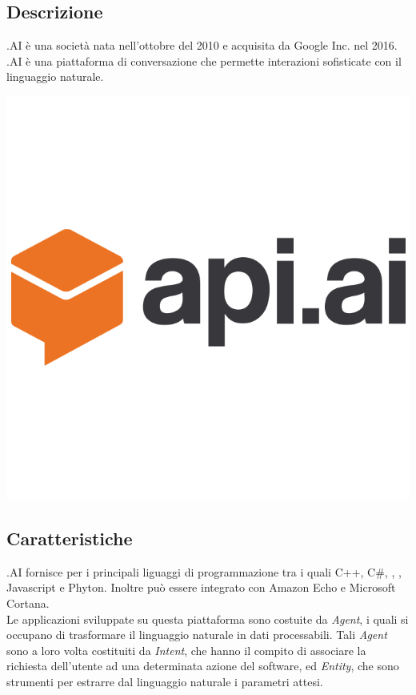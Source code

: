 \documentclass[a4paper,titlepage]{article}
\begin{document}
	\subsection{Descrizione}
	\begin{minipage}{0.7\textwidth}\raggedright
		.AI è una società nata nell'ottobre del 2010 e acquisita da Google Inc. nel 2016.
		.AI è una piattaforma di conversazione che permette interazioni sofisticate con il linguaggio naturale.
	\end{minipage}
	\hfill
	\noindent\begin{minipage}{0.1\textwidth}
		\includegraphics[scale=0.15]{images/apiai.png}
	\end{minipage}
	\subsection{Caratteristiche}
	.AI fornisce  per i principali liguaggi di programmazione tra i quali C++, C\#, , , Javascript e Phyton. Inoltre può essere integrato con Amazon Echo e Microsoft Cortana.\\
	Le applicazioni sviluppate su questa piattaforma sono costuite da \textit{Agent}, i quali si occupano di trasformare il linguaggio naturale in dati processabili.
	Tali \textit{Agent} sono a loro volta costituiti da \textit{Intent}, che hanno il compito di associare la richiesta dell'utente ad una determinata azione del software, ed \textit{Entity}, che sono strumenti per estrarre dal linguaggio naturale i parametri attesi.\\
	
\end{document}
